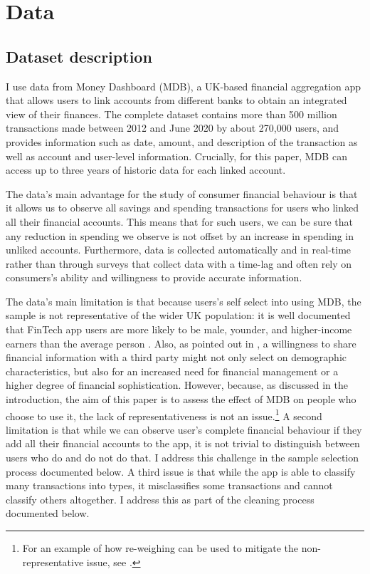 
\section{Data}%
\label{sec:data}

\subsection{Dataset description}%
\label{sub:dataset_description}

I use data from Money Dashboard (MDB), a UK-based financial aggregation app that
allows users to link accounts from different banks to obtain an integrated view
of their finances. The complete dataset contains more than 500 million
transactions made between 2012 and June 2020 by about 270,000 users, and
provides information such as date, amount, and description of the transaction
as well as account and user-level information. Crucially, for this paper, MDB
can access up to three years of historic data for each linked account.

The data's main advantage for the study of consumer financial behaviour is that
it allows us to observe all savings and spending transactions for users who
linked all their financial accounts. This means that for such users, we can be
sure that any reduction in spending we observe is not offset by an increase in
spending in unliked accounts. Furthermore, data is collected automatically and
in real-time rather than through surveys that collect data with a time-lag and
often rely on consumers's ability and willingness to provide accurate
information.

The data's main limitation is that because users's self select into using MDB,
the sample is not representative of the wider UK population: it is well
documented that FinTech app users are more likely to be male, younder, and
higher-income earners than the average person \citet{carlin2019generational}.
Also, as pointed out in \citet{gelman2014harnessing}, a willingness to share
financial information with a third party might not only select on demographic
characteristics, but also for an increased need for financial management or a
higher degree of financial sophistication. However, because, as discussed in
the introduction, the aim of this paper is to assess the effect of MDB on
people who choose to use it, the lack of representativeness is not an
issue.\footnote{For an example of how re-weighing can be used to mitigate the
non-representative issue, see \citet{bourquin2020effects}.} A second limitation
is that while we can observe user's complete financial behaviour if they add
all their financial accounts to the app, it is not trivial to distinguish
between users who do and do not do that. I address this challenge in the sample
selection process documented below. A third issue is that while the app is able
to classify many transactions into types, it misclassifies some transactions
and cannot classify others altogether. I address this as part of the cleaning
process documented below.

